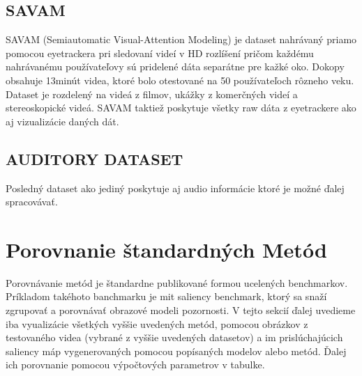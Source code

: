 \subsection{SAVAM}
SAVAM (Semiautomatic Visual-Attention Modeling) je dataset nahrávaný priamo pomocou eyetrackera pri sledovaní videí v HD rozlíšení pričom každému nahrávanému používateľovy sú pridelené dáta separátne pre kažké oko.
Dokopy obsahuje 13minút videa, ktoré bolo otestované na 50 používateľoch rôzneho veku.
Dataset je rozdelený na videá z filmov, ukážky z komerčných videí a stereoskopické videá.
SAVAM taktiež poskytuje všetky raw dáta z eyetrackere ako aj vizualizácie daných dát\cite{savam}.

\subsection{AUDITORY DATASET}
Posledný dataset ako jediný poskytuje aj audio informácie ktoré je možné ďalej spracovávať.


\section{Porovnanie štandardných Metód}
Porovnávanie metód je štandardne publikované formou ucelených benchmarkov.
Príkladom takéhoto banchmarku je mit saliency benchmark\cite{mit-saliency-benchmark}, ktorý sa snaží zgrupovať a porovnávať obrazové modeli pozornosti.
V tejto sekcií ďalej uvedieme iba vyualizácie všetkých vyššie uvedených metód, pomocou obrázkov z testovaného videa (vybrané z vyššie uvedených datasetov) a im prislúchajúcich saliency máp vygenerovaných pomocou popísaných modelov alebo metód.
Ďalej ich porovnanie pomocou výpočtových parametrov v tabulke.

